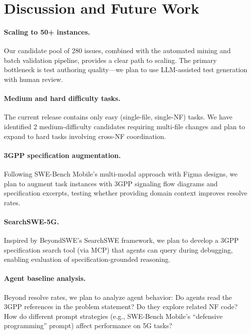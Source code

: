 \documentclass{article}
\begin{document}
\section{Discussion and Future Work}

\paragraph{Scaling to 50+ instances.} Our candidate pool of 280 issues, combined with the automated mining and batch validation pipeline, provides a clear path to scaling. The primary bottleneck is test authoring quality---we plan to use LLM-assisted test generation with human review.

\paragraph{Medium and hard difficulty tasks.} The current release contains only easy (single-file, single-NF) tasks. We have identified 2 medium-difficulty candidates requiring multi-file changes and plan to expand to hard tasks involving cross-NF coordination.

\paragraph{3GPP specification augmentation.} Following SWE-Bench Mobile's multi-modal approach with Figma designs, we plan to augment task instances with 3GPP signaling flow diagrams and specification excerpts, testing whether providing domain context improves resolve rates.

\paragraph{SearchSWE-5G.} Inspired by BeyondSWE's SearchSWE framework, we plan to develop a 3GPP specification search tool (via MCP) that agents can query during debugging, enabling evaluation of specification-grounded reasoning.

\paragraph{Agent baseline analysis.} Beyond resolve rates, we plan to analyze agent behavior: Do agents read the 3GPP references in the problem statement? Do they explore related NF code? How do different prompt strategies (e.g., SWE-Bench Mobile's ``defensive programming'' prompt) affect performance on 5G tasks?
\end{document}
